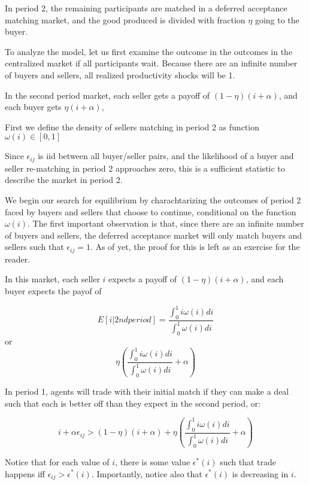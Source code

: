 \documentclass[AER]{AEA}
\begin{document}
In period 2, the remaining participants are matched in a deferred acceptance matching market, and the good produced is divided with fraction $\eta$ going to the buyer.

To analyze the model, let us first examine the outcome in the outcomes in the centralized market if all participants wait. 
Because there are an infinite number of buyers and sellers, all realized productivity shocks will be 1. 

In the second period market, each seller gets a payoff of $(1-\eta)( i + \alpha)$, and each buyer gets $\eta(i+\alpha)$,

First we define the density of sellers matching in period 2 as function
$\omega(i) \in [0,1]$

Since $\epsilon_{ij}$ is iid between all buyer/seller pairs, and the likelihood of a buyer and seller re-matching in period 2 approaches zero, this is a sufficient statistic to describe the market in period 2.  

We begin our search for equilibrium by charachtarizing the outcomes of period 2 faced by buyers and sellers that choose to continue, conditional on the function $\omega(i) $.    The first important observation is that, since there are an infinite number of buyers and sellers, the deferred acceptance market will only match buyers and sellers such that $\epsilon_{ij} = 1$. As of yet, the proof for this is left as an exercise for the reader.

In this market, each seller $i$ expects a payoff of $(1-\eta) (i+\alpha)$, and each buyer expects the payof of 

$$E[i|2nd period] =  \frac{\int_0^1 i \omega(i) di}{\int_0^1  \omega(i) di} $$
or
\begin{equation} \label{eq:E_buyer}
 \eta (\frac{\int_0^1 i \omega(i) di}{\int_0^1  \omega(i) di} + \alpha) 
\end{equation}

In period 1, agents will trade with their initial match if they can make a deal such that each is better off than they expect in the second period, or:

\begin{equation} \label{eq:ec_condition_raw}
 i+\alpha \epsilon_{ij} >(1-\eta)(i+\alpha ) + \eta (\frac{\int_0^1 i \omega(i) di}{\int_0^1  \omega(i) di} + \alpha) 
 \end{equation}

Notice that for each value of $i$, there is some value $\epsilon^* (i)$ such that trade happens iff $\epsilon_{ij} > \epsilon^* (i)$.  Importantly, notice also that $\epsilon^* (i)$ is decreasing in $i$.
\end{document}
